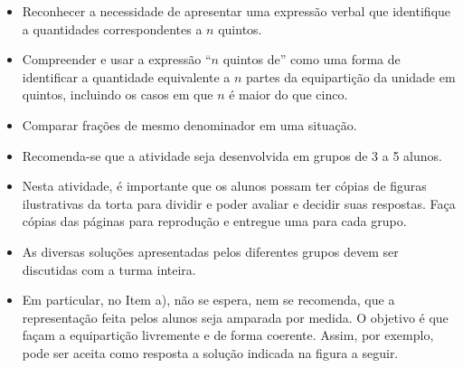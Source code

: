 \begin{multicols}{2}
\begin{objetivos}{}{}
  \begin{itemize} %
\item Reconhecer a necessidade de apresentar uma expressão verbal que identifique a quantidades correspondentes a $n$ quintos.
\item Compreender e usar a expressão ``$n$ quintos de'' como uma forma de identificar a quantidade equivalente a $n$ partes da equipartição da unidade em quintos, incluindo os casos em que $n$ é maior do que cinco.
\item Comparar frações de mesmo denominador em uma situação.
\end{itemize} %
\end{objetivos}

\begin{orientacoes}
  \begin{itemize} %
  \item       Recomenda-se que a atividade seja desenvolvida em grupos de 3 a 5 alunos.
  \item       Nesta atividade, é importante que os alunos possam ter cópias de figuras ilustrativas da torta para dividir e poder avaliar e decidir suas respostas. Faça cópias das páginas para reprodução e entregue uma para cada grupo.
  \item       As diversas soluções apresentadas pelos diferentes grupos devem ser discutidas com a turma inteira.
  \item       Em particular, no Item a), não se espera, nem se recomenda, que a representação feita pelos alunos seja amparada por medida. O objetivo é que façam a equipartição livremente e de forma coerente. Assim, por exemplo, pode ser aceita como resposta a solução indicada na figura a seguir.


\begin{center}



\end{center}
\end{itemize}
\end{orientacoes}
\end{multicols}
